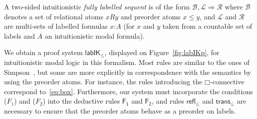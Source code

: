 \documentclass[twoside]{aiml20}
\newcommand{\B}{\mathcal{B}}
\newcommand{\Left}{\mathcal{L}}
\newcommand{\Right}{\mathcal{R}}
\newcommand*{\rel}{R}
\newcommand*{\rn}[1]  {\ensuremath{\mathsf{#1}}}
\newcommand*{\fm}[1]{#1}%
\newcommand*{\lb}[1]{#1}%
\newcommand*{\labels}[2]{\lb{#1}\mathord{:}\fm{#2}}
\newcommand*{\accs}[2]{\lb{#1}R\lb{#2}}
\newcommand*{\futs}[2]{\lb{#1}\le{\lb{#2}}}
\newcommand*{\IK}{\mathsf{IK}}
\newcommand*{\lab}{\mathsf{lab}}
\newcommand*{\BOX}{\mathord{\Box}}
\newcommand{\SEQ}{\Rightarrow}
\newcommand*{\labIKp}{\lab\IK_{\le}}
\begin{document}
\begin{definition}
	A two-sided intuitionistic \emph{fully labelled sequent} is of the form $\B, \Left \SEQ \Right$ where $\B$ denotes a set of relational atoms $\accs xy$ and preorder atoms $\futs xy$, and $\Left$ and $\Right$ are multi-sets of labelled formulas $\labels{x}{A}$ (for $\lb x$ and $\lb y$ taken from a countable set of labels and $A$ an intuitionistic modal formula).
\end{definition}






%
We obtain a proof system $\labIKp$, displayed on Figure~\ref{fig:labIKp}, for intuitionistic modal logic in this formalism. 
%
Most rules are similar to the ones of Simpson~\cite{simpson1994}, but some are more explicitly in correspondence with the semantics by using the preorder atoms. 
%
For instance, the rules introducing the $\BOX$-connective correspond to~\eqref{eq:box}.
%
Furthermore, our system must incorporate the conditions ($F_1$) and ($F_2$) into the deductive rules $\rn{F_1}$ and $\rn{F_2}$, and rules $\rn{refl_\le}$ and $\rn{trans_\le}$ are necessary to ensure that the preorder atoms behave as a preorder on labels.
%

%
%

\end{document}
